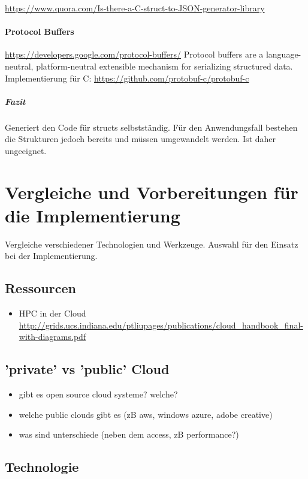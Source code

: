 \documentclass[a4paper,10pt]{article}
\begin{document}
\url{https://www.quora.com/Is-there-a-C-struct-to-JSON-generator-library}

\paragraph{Protocol Buffers}

\url{https://developers.google.com/protocol-buffers/}
Protocol buffers are a language-neutral, platform-neutral extensible mechanism for serializing structured data.
Implementierung für C:
\url{https://github.com/protobuf-c/protobuf-c}

\subparagraph{Fazit}

Generiert den Code für structs selbstständig.
Für den Anwendungsfall bestehen die Strukturen jedoch bereits und müssen umgewandelt werden.
Ist daher ungeeignet.

\newpage

\section{Vergleiche und Vorbereitungen für die Implementierung}

Vergleiche verschiedener Technologien und Werkzeuge.
Auswahl für den Einsatz bei der Implementierung.

\subsection{Ressourcen}

\begin{itemize}
 \item HPC in der Cloud \url{http://grids.ucs.indiana.edu/ptliupages/publications/cloud_handbook_final-with-diagrams.pdf}
\end{itemize}


\subsection{'private' vs 'public' Cloud}

\begin{itemize}
 \item gibt es open source cloud systeme? welche?
 \item welche public clouds gibt es (zB aws, windows azure, adobe creative)
 \item was sind unterschiede (neben dem access, zB performance?)
\end{itemize}

\subsection{Technologie}
\end{document}
